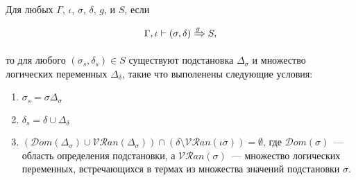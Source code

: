     \begin{lemma}$ $\par\nobreak\ignorespaces
      Для любых $\Gamma$, $\iota$, $\sigma$, $\delta$, $g$, и $S$, если 

      \[\Gamma, \iota \vdash (\sigma, \delta) \xRightarrow{g} S,\] 

      то для любого $(\sigma_s, \delta_s) \in S$ существуют подстановка $\Delta_{\sigma}$ и множество логических переменных $\Delta_{\delta}$, такие что выполенены следующие условия:
      \begin{enumerate}
        \item $\sigma_s = \sigma \Delta_{\sigma}$
        \item $\delta_s = \delta \cup \Delta_{\delta}$
        \item $(\mathcal{D}om(\Delta_{\sigma}) \cup \mathcal{VR}an(\Delta_{\sigma})) \cap (\delta \setminus \mathcal{VR}an(\iota \sigma)) = \emptyset$, где $\mathcal{D}om(\sigma)$~--- область определения подстановки, а $\mathcal{VR}an(\sigma)$~--- множество логических переменных, встречающихся в термах из множества значений подстановки $\sigma$.
      \end{enumerate}
    \end{lemma}
